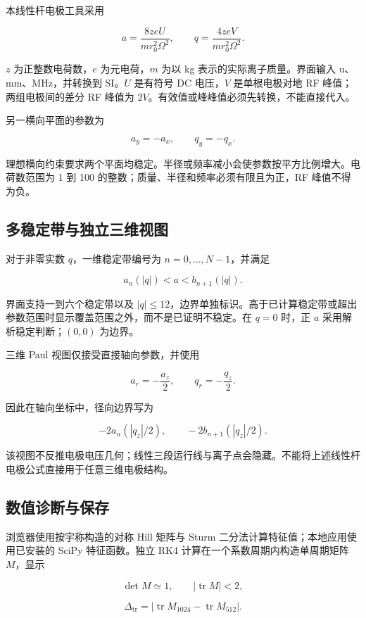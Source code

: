 \documentclass[
  aps,
  onecolumn,
  11pt]{revtex4-2}
\begin{document}
本线性杆电极工具采用

\[a=\frac{8zeU}{m r_0^2\Omega^2},\qquad q=\frac{4zeV}{m r_0^2\Omega^2}.\]

\(z\) 为正整数电荷数，\(e\) 为元电荷，\(m\) 为以 kg
表示的实际离子质量。界面输入 u、mm、MHz，并转换到 SI。\(U\) 是有符号 DC
电压，\(V\) 是单根电极对地 RF 峰值；两组电极间的差分 RF 峰值为
\(2V\)。有效值或峰峰值必须先转换，不能直接代入。

另一横向平面的参数为

\[a_y=-a_x,\qquad q_y=-q_x.\]

理想横向约束要求两个平面均稳定。半径或频率减小会使参数按平方比例增大。电荷数范围为
1 到 100 的整数；质量、半径和频率必须有限且为正，RF 峰值不得为负。

\subsection{多稳定带与独立三维视图}\label{ux591aux7a33ux5b9aux5e26ux4e0eux72ecux7acbux4e09ux7ef4ux89c6ux56fe}

对于非零实数 \(q\)，一维稳定带编号为 \(n=0,\ldots,N-1\)，并满足

\[a_n(|q|)<a<b_{n+1}(|q|).\]

界面支持一到六个稳定带以及
\(|q|\leq12\)，边界单独标识。高于已计算稳定带或超出参数范围时显示覆盖范围之外，而不是已证明不稳定。在
\(q=0\) 时，正 \(a\) 采用解析稳定判断；\((0,0)\) 为边界。

三维 Paul 视图仅接受直接轴向参数，并使用

\[a_r=-\frac{a_z}{2},\qquad q_r=-\frac{q_z}{2}.\]

因此在轴向坐标中，径向边界写为

\[-2a_n(|q_z|/2),\qquad -2b_{n+1}(|q_z|/2).\]

该视图不反推电极电压几何；线性三段运行线与离子点会隐藏。不能将上述线性杆电极公式直接用于任意三维电极结构。

\subsection{数值诊断与保存}\label{ux6570ux503cux8bcaux65adux4e0eux4fddux5b58}

浏览器使用按宇称构造的对称 Hill 矩阵与 Sturm
二分法计算特征值；本地应用使用已安装的 SciPy 特征函数。独立 RK4
计算在一个系数周期内构造单周期矩阵 \(M\)，显示

\[\det M\simeq1,\qquad |\operatorname{tr}M|<2,\]

\[\Delta_{\mathrm{tr}}=|\operatorname{tr}M_{1024}-\operatorname{tr}M_{512}|.\]
\end{document}
